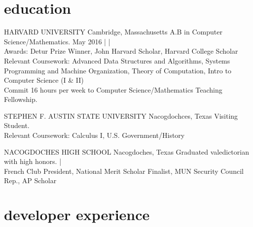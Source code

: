\documentclass[]{friggeri-cv} %
\begin{document}

\section{education}

{HARVARD UNIVERSITY}
{Cambridge, Massachusetts}
{A.B in Computer Science/Mathematics.
May 2016 |
 |
\\
Awards: Detur Prize Winner, John Harvard Scholar, Harvard College Scholar \\
Relevant Coursework: Advanced Data Structures and Algorithms,  Systems Programming and Machine Organization, Theory of Computation, Intro to Computer Science (I \& II)\\
Commit 16 hours per week to Computer Science/Mathematics Teaching Fellowship.\\
}
\begin{detailed}
{STEPHEN F. AUSTIN STATE UNIVERSITY}
{Nacogdochces, Texas}
{Visiting Student. \\
Relevant Coursework: Calculus I, U.S. Government/History \\
}
\end{detailed}
{NACOGDOCHES HIGH SCHOOL}
{Nacogdoches, Texas}
{Graduated valedictorian with high honors.  | \\
French Club President, National Merit Scholar Finalist, MUN Security Council Rep., AP Scholar}



\section{developer experience}
\end{document}
